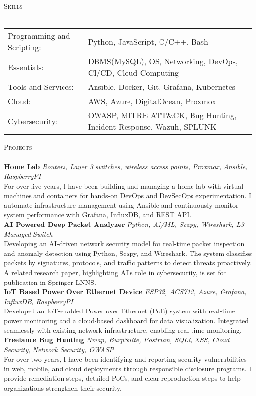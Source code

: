 \documentclass[a4paper]{article}
\newcommand{\lineunder} {
    \vspace*{-8pt} \\
    \hspace*{-18pt} \hrulefill \\
}
\newcommand{\header} [1] {
    {\hspace*{-18pt}\vspace*{6pt} \textsc{#1}}
    \vspace*{-6pt} \lineunder
}
\begin{document}
\header{Skills}
\begin{tabular}{ l l }
	Programming and Scripting: & Python, JavaScript, C/C++, Bash                                     \\
	Essentials:                & DBMS(MySQL), OS, Networking, DevOps, CI/CD, Cloud Computing         \\
	Tools and Services:        & Ansible, Docker, Git, Grafana, Kubernetes                           \\
	Cloud:                     & AWS, Azure, DigitalOcean, Proxmox                                   \\
	Cybersecurity:             & OWASP, MITRE ATT\&CK, Bug Hunting, Incident Response, Wazuh, SPLUNK \\
\end{tabular}
\vspace{2mm}

\header{Projects}
{\textbf{Home Lab}} {\sl Routers, Layer 3 switches, wireless access points, Proxmox, Ansible, RaspberryPI} \\
For over five years, I have been building and managing a home lab with virtual machines and containers for hands-on DevOps and DevSecOps experimentation. I automate infrastructure management using Ansible and continuously monitor system performance with Grafana, InfluxDB, and REST API.\\
\vspace*{2mm}
{\textbf{AI Powered Deep Packet Analyzer}} {\sl Python, AI/ML, Scapy, Wireshark, L3 Managed Switch} \\
Developing an AI-driven network security model for real-time packet inspection and anomaly detection using Python, Scapy, and Wireshark. The system classifies packets by signatures, protocols, and traffic patterns to detect threats proactively. A related research paper, highlighting AI’s role in cybersecurity, is set for publication in Springer LNNS.\\
\vspace*{2mm}
{\textbf{IoT Based Power Over Ethernet Device}} {\sl ESP32, ACS712, Azure, Grafana, InfluxDB, RaspberryPI} \\
Developed an IoT-enabled Power over Ethernet (PoE) system with real-time power monitoring and a cloud-based dashboard for data visualization. Integrated seamlessly with existing network infrastructure, enabling real-time monitoring.\\
\vspace*{2mm}
{\textbf{Freelance Bug Hunting}} {\sl Nmap, BurpSuite, Postman, SQLi, XSS, Cloud Security, Network Security, OWASP} \\
For over two years, I have been identifying and reporting security vulnerabilities in web, mobile, and cloud deployments through responsible disclosure programs. I provide remediation steps, detailed PoCs, and clear reproduction steps to help organizations strengthen their security.\\
\vspace*{2mm}



\ 
\end{document}
